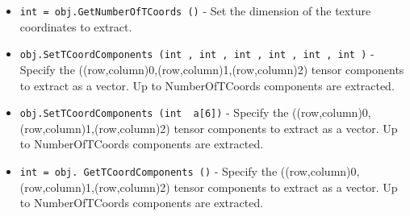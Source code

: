 \begin{itemize}
\item  \verb|int = obj.GetNumberOfTCoords ()| -  Set the dimension of the texture coordinates to extract.

\item  \verb|obj.SetTCoordComponents (int , int , int , int , int , int )| -  Specify the ((row,column)0,(row,column)1,(row,column)2) tensor
 components to extract as a vector. Up to NumberOfTCoords
 components are extracted.

\item  \verb|obj.SetTCoordComponents (int  a[6])| -  Specify the ((row,column)0,(row,column)1,(row,column)2) tensor
 components to extract as a vector. Up to NumberOfTCoords
 components are extracted.

\item  \verb|int = obj. GetTCoordComponents ()| -  Specify the ((row,column)0,(row,column)1,(row,column)2) tensor
 components to extract as a vector. Up to NumberOfTCoords
 components are extracted.

\end{itemize}
